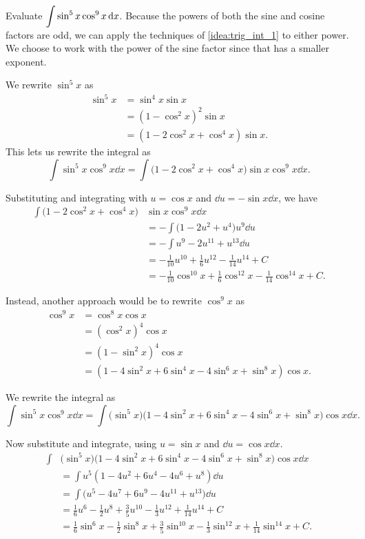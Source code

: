 \begin{example}\label{ex_trigint2}%
Evaluate $\displaystyle \int\sin^5x\cos^9x\operatorname{d}\! x$.
\solution
Because the powers of both the sine and cosine factors are odd, we can apply the techniques of \autoref{idea:trig_int_1} to either power.
We choose to work with the power of the sine factor since that has a smaller exponent.

We rewrite $\sin^5x$ as
\begin{align*}
 \sin^5x&=\sin^4x\sin x\\
 &=(1-\cos^2x)^2\sin x\\
 &=(1-2\cos^2x+\cos^4x)\sin x.
\end{align*}
This lets us rewrite the integral as
\[
\int\sin^5x\cos^9x\dd x=\int\bigl(1-2\cos^2x+\cos^4x\bigr)\sin x\cos^9x\dd x.
\]

Substituting and integrating with $u=\cos x$ and $\dd u=-\sin x\dd x$, we have
\begin{align*}
\int\bigl(1-2\cos^2x+\cos^4x\bigr)&\sin x\cos^9x\dd x\\
&=-\int\bigl(1-2u^2+u^4\bigr)u^9\dd u\\
&=-\int u^9-2u^{11}+u^{13}\dd u\\
&=-\frac1{10}u^{10}+\frac16u^{12}-\frac1{14}u^{14}+C\\
&=-\frac1{10}\cos^{10}x+\frac16\cos^{12}x-\frac1{14}\cos^{14}x+C.
\end{align*}

Instead, another approach would be to rewrite $\cos^9x$ as
\begin{align*} \cos^9 x &= \cos^8x\cos x \\
				&= (\cos^2x)^4\cos x \\
				&= (1-\sin^2x)^4\cos x \\
				&= (1-4\sin^2x+6\sin^4x-4\sin^6x+\sin^8x)\cos x.
\end{align*}

We rewrite the integral as 
\[\int\sin^5x\cos^9x\dd x = \int\bigl(\sin^5x\bigr)\bigl(1-4\sin^2x+6\sin^4x-4\sin^6x+\sin^8x\bigr)\cos x\dd x.\]

Now substitute and integrate, using $u = \sin x $ and $\dd u = \cos x\dd x$.
\begin{align*}
 \int & \bigl(\sin^5x\bigr)\bigl(1-4\sin^2x+6\sin^4x-4\sin^6x+\sin^8x\bigr)\cos x\dd x \\
 &=\int u^5(1-4u^2+6u^4-4u^6+u^8)\dd u \\
 &= \int\bigl(u^5-4u^7+6u^9-4u^{11}+u^{13}\bigr)\dd u \\
 &= \frac16u^6-\frac12u^8+\frac35u^{10}-\frac13u^{12}+\frac{1}{14}u^{14}+C\\
 &= \frac16\sin^6 x-\frac12\sin^8 x+\frac35\sin^{10} x-\frac13\sin^{12} x+\frac{1}{14}\sin^{14} x+C.
\end{align*}
%
\end{example}

